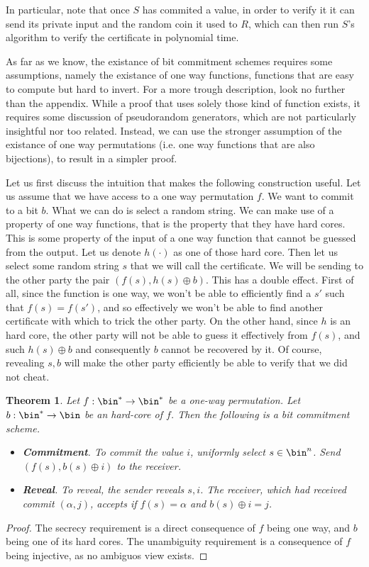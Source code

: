 \documentclass{article}
\newtheorem{theorem}{Theorem}
\begin{document}
In particular, note that once $S$ has commited a value, in order to verify it it can send its private input and the random coin it used to $R$, which can then
run $S$'s algorithm to verify the certificate in polynomial time. \par
As far as we know, the existance of bit commitment schemes requires some assumptions, namely the existance of one way functions, functions that are easy to compute but hard to invert.
For a more trough description, look no further than the appendix.
While a proof that uses solely those kind of function exists, it requires some discussion of pseudorandom generators, which are not particularly insightful nor too related.
Instead, we can use the stronger assumption of the existance of one way permutations (i.e. one way functions that are also bijections), to result in a simpler proof.\par
Let us first discuss the intuition that makes the following construction useful. Let us assume that we have access to a one way permutation $f$.
We want to commit to a bit $b$. What we can do is select a random string. We can make use of a property of one way functions, that is the 
property that they have hard cores. This is some property of the input of a one way function that cannot be guessed from the output. 
Let us denote $h(\cdot)$ as one of those hard core. Then let us select some random string $s$ that we will call the certificate. We will be sending to 
the other party the pair $(f(s), h(s) \oplus b)$. This has a double effect. First of all, since the function is one way, we won't be able to 
efficiently find a $s'$ such that $f(s) = f(s')$, and so effectively we won't be able to find another certificate with which to trick the other party. 
On the other hand, since $h$ is an hard core, the other party will not be able to guess it effectively from $f(s)$, and such $h(s) \oplus b$ and consequently $b$ cannot 
be recovered by it. Of course, revealing $s, b$ will make the other party efficiently be able to verify that we did not cheat.
\begin{theorem}
    Let $f: \bin^* \to \bin^*$ be a one-way permutation. Let $b: \bin^* \to \bin$ be an hard-core of $f$. Then the following is a bit commitment scheme.
    \begin{itemize}
        \item \textbf{Commitment}. To commit the value $i$, uniformly select $s \in \bin^n$. Send $(f(s), b(s) \oplus i)$ to the receiver.
        \item \textbf{Reveal}. To reveal, the sender reveals $s, i$. The receiver, which had received commit $(\alpha, j)$, accepts if $f(s) = \alpha$ and $b(s) \oplus i = j$.
    \end{itemize}
\end{theorem}
\begin{proof}
    The secrecy requirement is a direct consequence of $f$ being one way, and $b$ being one of its hard cores.
    The unambiguity requirement is a consequence of $f$ being injective, as no ambiguos view exists.
\end{proof}
\end{document}

